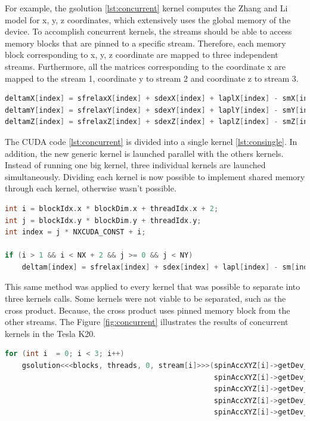 For example, the {\listf gsolution} \ref{lst:concurrent} kernel computes the Zhang and Li model for x, y, z coordinates, which extensively uses the global memory of the device. To accomplish concurrent kernels, the streams should be able to access memory blocks that are pinned to a specific stream. Therefore, each memory block corresponding to x, y, z coordinate are mapped to three independent streams. Furthermore, all the matrices corresponding to the coordinate x are mapped to the stream 1, coordinate y to stream 2 and coordinate z to stream 3.

\begin{lstlisting}[language=C++, label={lst:concurrent}, caption={Evaluation of x, y, z coordinates of the Zhang and Li model in a single kernel.}]
deltamX[index] = sfrelaxX[index] + sdexX[index] + laplX[index] - smX[index];
deltamY[index] = sfrelaxY[index] + sdexY[index] + laplY[index] - smY[index];
deltamZ[index] = sfrelaxZ[index] + sdexZ[index] + laplZ[index] - smZ[index];
\end{lstlisting}
 
The CUDA code \ref{lst:concurrent} is divided into a single kernel \ref{lst:consingle}. In addition, the new generic kernel is launched parallel with the others kernels. Instead of running one big kernel, three individual kernels are launched simultaneously. Dividing each kernel is now possible to implement shared memory through each kernel, otherwise wasn't possible. 

\begin{lstlisting}[language=C++, label={lst:consingle}, caption={Evaluation of individual coordinates of the Zhang and Li model}]
int i = blockIdx.x * blockDim.x + threadIdx.x + 2;
int j = blockIdx.y * blockDim.y + threadIdx.y;
int index = j * NXCUDA_CONST + i;

if (i > 1 && i < NX + 2 && j >= 0 && j < NY)
	deltam[index] = sfrelax[index] + sdex[index] + lapl[index] - sm[index];
\end{lstlisting}

This same method was applied to every kernel that was possible to separate into three kernels calls. Some kernels were not viable to be separated, such as the cross product. Because, the cross product uses pinned memory block from the other streams. The Figure \ref{fig:concurrent} illustrates the results of concurrent kernels in the Tesla K20.

\begin{lstlisting}[language=C++, caption={Evaluate Zhang and Li model.}]
for (int i  = 0; i < 3; i++)
	gsolution<<<blocks, threads, 0, stream[i]>>>(spinAccXYZ[i]->getDev_deltam(),
												 spinAccXYZ[i]->getDev_sfrelax(), 
												 spinAccXYZ[i]->getDev_sm(), 
											 	 spinAccXYZ[i]->getDev_sdex(),
											 	 spinAccXYZ[i]->getDev_lapl());
\end{lstlisting}

